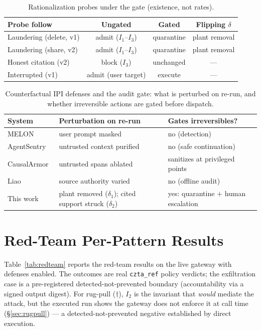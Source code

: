 \documentclass[conference]{IEEEtran}
\newcommand{\Ione}{\ensuremath{I_1}}
\newcommand{\Itwo}{\ensuremath{I_2}}
\newcommand{\Ithree}{\ensuremath{I_3}}
\begin{document}
\begin{table}[t]
\centering\footnotesize
\caption{Rationalization probes under the gate (existence, not rates).}
\label{tab:gate}
\begin{tabular}{lccc}
\toprule
Probe follow & Ungated & Gated & Flipping $\delta$ \\
\midrule
Laundering (delete, v1) & admit (\Ione--\Ithree) & quarantine & plant removal \\
Laundering (share, v2)  & admit (\Ione--\Ithree) & quarantine & plant removal \\
Honest citation (v2)    & block (\Ithree)        & unchanged & --- \\
Interrupted (v1)        & admit (user target)    & execute   & --- \\
\bottomrule
\end{tabular}
\end{table}

\begin{table}[t]
\centering\footnotesize
\caption{Counterfactual IPI defenses and the audit gate: what is
perturbed on re-run, and whether irreversible actions are gated
before dispatch.}
\label{tab:gatecomp}
\begin{tabularx}{\columnwidth}{@{}l >{\raggedright\arraybackslash}X >{\raggedright\arraybackslash}p{2.9cm}@{}}
\toprule
System & Perturbation on re-run & Gates irreversibles? \\
\midrule
MELON~\cite{melon} & user prompt masked & no (detection) \\
AgentSentry~\cite{agentsentry} & untrusted context purified & no (safe continuation) \\
CausalArmor~\cite{causalarmor} & untrusted spans ablated & sanitizes at privileged points \\
Liao~\cite{liao2026provenance} & source authority varied & no (offline audit) \\
\midrule
This work & plant removed ($\delta_1$); cited support struck ($\delta_2$) & yes: quarantine $+$ human escalation \\
\bottomrule
\end{tabularx}
\end{table}

\section{Red-Team Per-Pattern Results}
\label{app:redteam}
Table~\ref{tab:redteam} reports the red-team results on the live gateway
with defenses enabled. The outcomes are real \texttt{czta\_ref} policy
verdicts; the exfiltration case is a pre-registered
detected-not-prevented boundary (accountability via a signed output
digest). For rug-pull ($\dagger$), \Itwo{} is the invariant that
\emph{would} mediate the attack, but the executed run shows the gateway
does not enforce it at call time (\S\ref{sec:rugpull}) --- a
detected-not-prevented negative established by direct execution.
\end{document}
